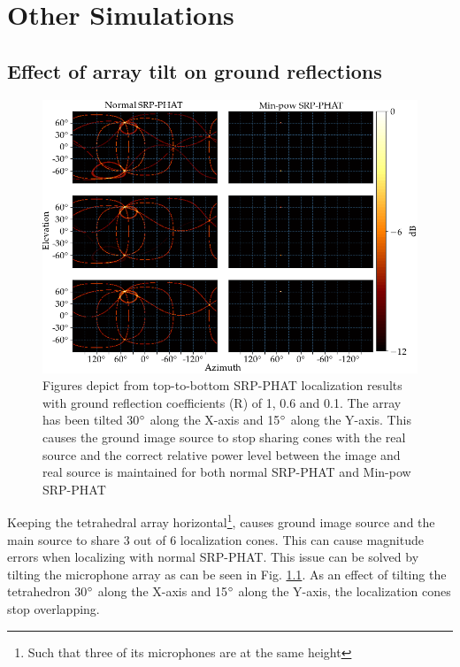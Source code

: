 \chapter{Other Simulations}
\section{Effect of array tilt on ground reflections}\label{sec:refTilted}
\begin{figure}[!ht]
\centering
\includegraphics[width=\textwidth]{Figures/refSim.png}
\caption{Figures depict from top-to-bottom SRP-PHAT localization results with ground reflection coefficients (R) of 1, 0.6 and 0.1. The array has been tilted 30$\degree$ along the X-axis and 15$\degree$ along the Y-axis. This causes the ground image source to stop sharing cones with the real source and the correct relative power level between the image and real source is maintained for both normal SRP-PHAT and Min-pow SRP-PHAT}
\label{fig:4mic1srcRefTilt}
\end{figure}
Keeping the tetrahedral array horizontal\footnote{Such that three of its microphones are at the same height}, causes ground image source and the main source to share 3 out of 6 localization cones. This can cause magnitude errors when localizing with normal SRP-PHAT. This issue can be solved by tilting the microphone array as can be seen in Fig. \ref{fig:4mic1srcRefTilt}. As an effect of tilting the tetrahedron 30$\degree$ along the X-axis and 15$\degree$ along the Y-axis, the localization cones stop overlapping. 


